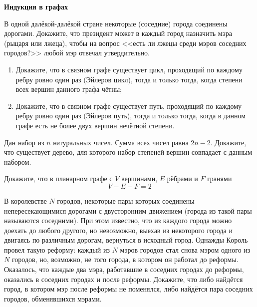 \documentclass{article}
\begin{document}
    \large

    \begin{center}
        \textbf{Индукция в графах}
    \end{center}


    \begin{enumerate_boxed}

        \item В одной далёкой-далёкой стране некоторые (соседние) города соединены дорогами.
        Докажите, что президент может в каждый город назначить мэра (рыцаря или лжеца), чтобы на вопрос <<есть ли лжецы среди мэров соседних городов?>> любой мэр отвечал утвердительно.

        \item
        \begin{enumerate}
            \item Докажите, что в связном графе существует цикл, проходящий по каждому ребру ровно один раз (Эйлеров
            цикл), тогда и только тогда, когда степени всех вершин данного графа чётны;
            \item Докажите, что в связном графе
            существует путь, проходящий по каждому ребру ровно один раз (Эйлеров путь), тогда и только тогда, когда в
            данном графе есть не более двух вершин нечётной степени.
        \end{enumerate}

        \item Дан набор из $n$ натуральных чисел.
        Сумма всех чисел равна $2n-2$.
        Докажите, что существует дерево, для которого набор степеней вершин совпадает с данным набором.

        \item Докажите, что в планарном графе с $V$ вершинами, $E$ рёбрами и $F$ гранями \[V - E + F = 2\]

        \item В королевстве $N$ городов, некоторые пары которых соединены непересекающимися дорогами с двусторонним движением (города из такой пары называются соседними).
        При этом известно, что из каждого города можно доехать до любого другого, но невозможно, выехав из некоторого города и двигаясь по различным дорогам, вернуться в исходный город.
        Однажды Король провел такую реформу: каждый из $N$ мэров городов стал снова мэром одного из $N$ городов, но, возможно, не того города, в котором он работал до реформы.
        Оказалось, что каждые два мэра, работавшие в соседних городах до реформы, оказались в соседних городах и после реформы.
        Докажите, что либо найдётся город, в котором мэр после реформы не поменялся, либо найдётся пара соседних городов, обменявшихся мэрами.


\end{enumerate_boxed}
\end{document}
